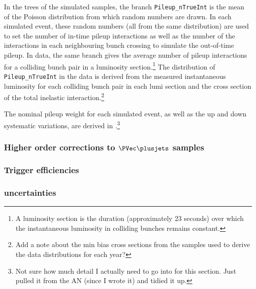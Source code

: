 In the trees of the simulated samples, the branch \texttt{Pileup\_nTrueInt} is the mean of the Poisson distribution from which random numbers are drawn. In each simulated event, these random numbers (all from the same distribution) are used to set the number of in-time \gls{pileup} interactions as well as the number of the interactions in each neighbouring bunch crossing to simulate the out-of-time \gls{pileup}. In data, the same branch gives the average number of \gls{pileup} interactions for a colliding bunch pair in a luminosity section.\footnote{A luminosity section is the duration (approximately 23 seconds) over which the instantaneous luminosity in colliding bunches remains constant.} The distribution of \texttt{Pileup\_nTrueInt} in the data is derived from the measured instantaneous luminosity for each colliding bunch pair in each lumi section and the cross section of the total inelastic \pp interaction.\footnote{Add a note about the min bias cross sections from the samples used to derive the data distributions for each year?}

The nominal \gls{pileup} weight for each simulated event, as well as the up and down systematic variations, are derived in \nanoAODtools.\footnote{Not sure how much detail I actually need to go into for this section. Just pulled it from the AN (since I wrote it) and tidied it up.} %




\subsubsection{Higher order corrections to \texorpdfstring{$\PVec \plusjets$}{V plus jets} samples}
\label{subsubsec:htoinv_nlo_corrs}




\subsubsection{Trigger efficiencies}
\label{subsubsec:htoinv_trigger_effs}




\subsubsection{\texorpdfstring{\ttbar}{ttbar} uncertainties}
\label{subsubsec:htoinv_ttbar_uncerts}

